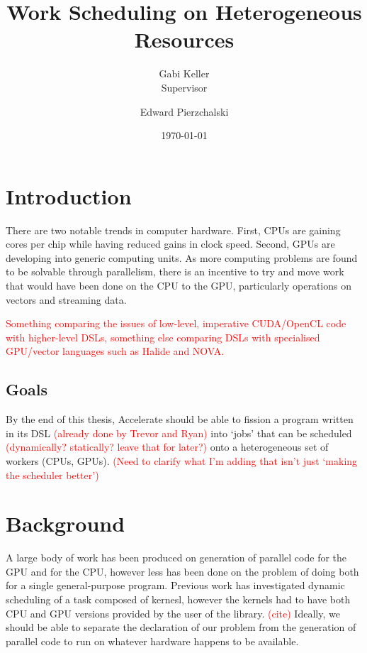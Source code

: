 \documentclass[a4paper,12pt]{article}
\title{Work Scheduling on Heterogeneous Resources}
\date{\today}
\author{Gabi Keller\\\small{Supervisor} \and Edward Pierzchalski}
\newcommand{\red}[1]{\textcolor{red}{#1}}
\begin{document}
\maketitle

\pagebreak

\begin{multicols*}{2}

\section{Introduction}

There are two notable trends in computer hardware. 
First, CPUs are gaining cores per chip while having reduced gains in clock speed.
Second, GPUs are developing into generic computing units. 
As more computing problems are found to be solvable through parallelism, there is an incentive to try and move work that would have been done on the CPU to the GPU, particularly operations on vectors and streaming data.

\red{Something comparing the issues of low-level, imperative CUDA/OpenCL code with higher-level DSLs, something else comparing DSLs with specialised GPU/vector languages such as Halide and NOVA.}


\subsection{Goals}

By the end of this thesis, Accelerate should be able to fission a program written in its DSL \red{(already done by Trevor and Ryan)} into `jobs' that can be scheduled \red{(dynamically? statically? leave that for later?)} onto a heterogeneous set of workers (CPUs, GPUs).
\red{(Need to clarify what I'm adding that isn't just `making the scheduler better')}


\section{Background}

A large body of work has been produced on generation of parallel code for the GPU and for the CPU, however less has been done on the problem of doing both for a single general-purpose program. 
Previous work has investigated dynamic scheduling of a task composed of kernesl, however the kernels had to have both CPU and GPU versions provided by the user of the library. \red{(cite)} 
Ideally, we should be able to separate the declaration of our problem from the generation of parallel code to run on whatever hardware happens to be available.


\end{multicols*}
\end{document}
